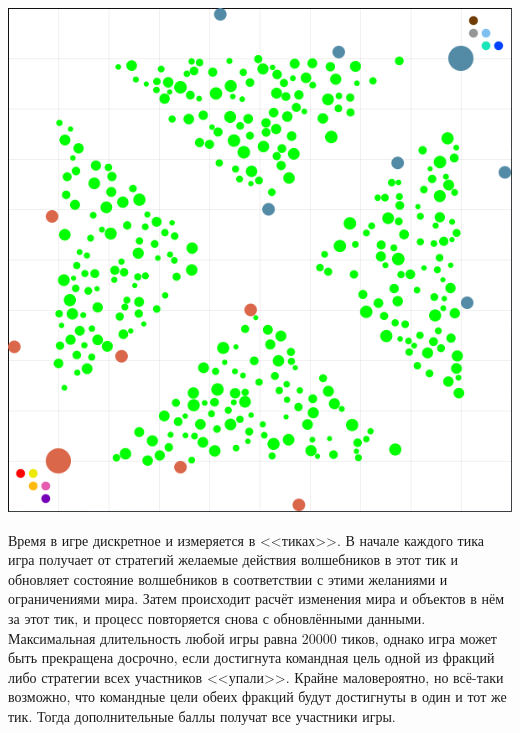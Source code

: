 \includegraphics{images/map.png}

Время в игре дискретное и измеряется в <<тиках>>. В начале каждого тика игра получает от стратегий желаемые действия волшебников в этот тик
и обновляет состояние волшебников в соответствии с этими желаниями и ограничениями мира. Затем происходит расчёт изменения мира и объектов в
нём за этот тик, и процесс повторяется снова с обновлёнными данными. Максимальная длительность любой игры равна $20000$ тиков, однако игра
может быть прекращена досрочно, если достигнута командная цель одной из фракций либо стратегии всех участников <<упали>>. Крайне
маловероятно, но всё-таки возможно, что командные цели обеих фракций будут достигнуты в один и тот же тик. Тогда дополнительные баллы
получат все участники игры.

